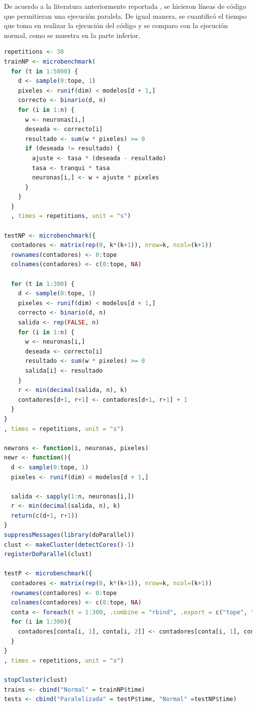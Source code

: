 \documentclass[12pt, letterpaper] {article}
\begin{document}
De acuerdo a la literatura anteriormente reportada \cite{PAP12}, se hicieron líneas de código que permitieran una ejecución paralela. De igual manera, se cuantificó el tiempo que toma en realizar la ejecución del código y se comparo con la ejecución normal, como se muestra en la parte inferior.

\begin{lstlisting}[language=R]
repetitions <- 30
trainNP <- microbenchmark(
  for (t in 1:5000) { 
    d <- sample(0:tope, 1)
    pixeles <- runif(dim) < modelos[d + 1,]
    correcto <- binario(d, n)
    for (i in 1:n) {
      w <- neuronas[i,]
      deseada <- correcto[i]
      resultado <- sum(w * pixeles) >= 0
      if (deseada != resultado) {
        ajuste <- tasa * (deseada - resultado)
        tasa <- tranqui * tasa
        neuronas[i,] <- w + ajuste * pixeles
      }
    }
  }
  , times = repetitions, unit = "s")

testNP <- microbenchmark({
  contadores <- matrix(rep(0, k*(k+1)), nrow=k, ncol=(k+1))
  rownames(contadores) <- 0:tope
  colnames(contadores) <- c(0:tope, NA)

  for (t in 1:300) {
    d <- sample(0:tope, 1)
    pixeles <- runif(dim) < modelos[d + 1,] 
    correcto <- binario(d, n)
    salida <- rep(FALSE, n)
    for (i in 1:n) {
      w <- neuronas[i,]
      deseada <- correcto[i]
      resultado <- sum(w * pixeles) >= 0
      salida[i] <- resultado
    }
    r <- min(decimal(salida, n), k) 
    contadores[d+1, r+1] <- contadores[d+1, r+1] + 1
  }
}
, times = repetitions, unit = "s")

newrons <- function(i, neuronas, pixeles)
newr <- function(){
  d <- sample(0:tope, 1)
  pixeles <- runif(dim) < modelos[d + 1,] 
  
  salida <- sapply(1:n, neuronas[i,])
  r <- min(decimal(salida, n), k)
  return(c(d+1, r+1))
}
suppressMessages(library(doParallel))
clust <- makeCluster(detectCores()-1)
registerDoParallel(clust)

testP <- microbenchmark({
  contadores <- matrix(rep(0, k*(k+1)), nrow=k, ncol=(k+1))
  rownames(contadores) <- 0:tope
  colnames(contadores) <- c(0:tope, NA)
  conta <- foreach(t = 1:300, .combine = "rbind", .export = c("tope", "dim", "modelos", "neuronas", "pixeles")) %dopar% newr()
  for (i in 1:300){
    contadores[conta[i, 1], conta[i, 2]] <- contadores[conta[i, 1], conta[i, 2]] + 1
  }
}
, times = repetitions, unit = "s")

stopCluster(clust)
trains <- cbind("Normal" = trainNP$time)
tests <- cbind("Paralelizada" = testP$time, "Normal" =testNP$time)
\end{lstlisting}
\end{document}
